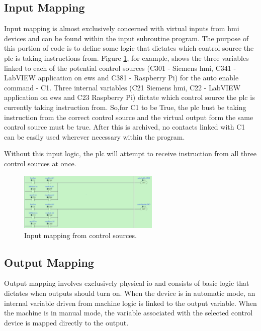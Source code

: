     \subsection{Input Mapping} \label{sec:input}
        Input mapping is almost exclusively concerned with virtual inputs from \acrshort{hmi} devices and can be found within the input subroutine program. The purpose of this portion of code is to define some logic that dictates which control source the \acrshort{plc} is taking instructions from. Figure \ref{fig:inputMapping}, for example, shows the three variables linked to each of the potential control sources (C301 - Siemens \acrshort{hmi}, C341 - LabVIEW application on \acrshort{ews} and C381 - Raspberry Pi) for the auto enable command - C1. Three internal variables (C21 Siemens \acrshort{hmi}, C22 - LabVIEW application on \acrshort{ews} and C23 Raspberry Pi) dictate which control source the \acrshort{plc} is currently taking instruction from. So,for C1 to be True, the \acrshort{plc} bust be taking instruction from the correct control source and the virtual output form the same control source must be true. After this is archived, \acrshort{no} contacts linked with C1 can be easily used wherever necessary within the program. 

        Without this input logic, the \acrshort{plc} will attempt to receive instruction from all three control sources at once.
        
        \begin{figure}[H]
            \centering
            \includegraphics[width = 0.6\textwidth]{2_images/inputMapping}
            \caption{Input mapping from control sources.}
            \label{fig:inputMapping}
        \end{figure}
        
    \subsection{Output Mapping} \label{sec:output}
        Output mapping involves exclusively physical \acrshort{io} and consists of basic logic that dictates when outputs should turn on. When the device is in automatic mode, an internal variable driven from machine logic is linked to the output variable. When the machine is in manual mode, the variable associated with the selected control device is mapped directly to the output. 

